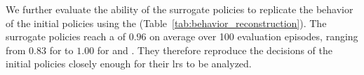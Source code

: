 We further evaluate the ability of the surrogate policies to replicate the behavior of the initial policies using the \BehaviorReconstructionName (Table~\ref{tab:behavior_reconstruction}).
The surrogate policies reach a \BehaviorReconstructionName of $0.96$ on average over 100 evaluation episodes, ranging from $0.83$ for \BreakoutName to $1.00$ for \MsPacManName and \SurroundName.
They therefore reproduce the decisions of the initial policies closely enough for their \glspl{lr} to be analyzed.


